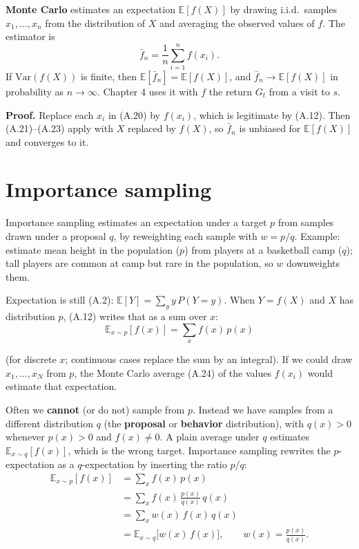\textbf{Monte Carlo} estimates an expectation $\mathbb{E}[f(X)]$ by drawing i.i.d.\ samples $x_1,\ldots,x_n$ from the distribution of $X$ and averaging the observed values of $f$. The estimator is
\begin{equation}
\bar{f}_n
=
\frac{1}{n}\sum_{i=1}^{n} f(x_i).
\tag{A.24}\label{eq:A.24}
\end{equation}
If $\mathrm{Var}(f(X))$ is finite, then $\mathbb{E}[\bar{f}_n]=\mathbb{E}[f(X)]$, and $\bar{f}_n\to\mathbb{E}[f(X)]$ in probability as $n\to\infty$. Chapter 4 uses it with $f$ the return $G_t$ from a visit to $s$.

\textbf{Proof.}
Replace each $x_i$ in (A.20) by $f(x_i)$, which is legitimate by (A.12). Then (A.21)--(A.23) apply with $X$ replaced by $f(X)$, so $\bar{f}_n$ is unbiased for $\mathbb{E}[f(X)]$ and converges to it.

\section{Importance sampling}

Importance sampling estimates an expectation under a target $p$ from samples drawn under a proposal $q$, by reweighting each sample with $w=p/q$. Example: estimate mean height in the population ($p$) from players at a basketball camp ($q$); tall players are common at camp but rare in the population, so $w$ downweights them.

Expectation is still (A.2): $\mathbb{E}[Y]=\sum_y y\,P(Y=y)$. When $Y=f(X)$ and $X$ has distribution $p$, (A.12) writes that as a sum over $x$: \[
\mathbb{E}_{x\sim p}[f(x)]
=
\sum_x f(x)\, p(x)
\]

(for discrete $x$; continuous cases replace the sum by an integral). If we could draw $x_1,\ldots,x_N$ from $p$, the Monte Carlo average (A.24) of the values $f(x_i)$ would estimate that expectation.

Often we \textbf{cannot} (or do not) sample from $p$. Instead we have samples from a different distribution $q$ (the \textbf{proposal} or \textbf{behavior} distribution), with $q(x)>0$ whenever $p(x)>0$ and $f(x)\neq 0$. A plain average under $q$ estimates $\mathbb{E}_{x\sim q}[f(x)]$, which is the wrong target. Importance sampling rewrites the $p$-expectation as a $q$-expectation by inserting the ratio $p/q$: \begin{equation}
\begin{aligned}
\mathbb{E}_{x\sim p}[f(x)]
&=
\sum_x f(x)\, p(x)
\\
&=
\sum_x f(x)\, \frac{p(x)}{q(x)}\, q(x)
\\
&=
\sum_x w(x)\, f(x)\, q(x)
\\
&=
\mathbb{E}_{x\sim q}\bigl[w(x)\, f(x)\bigr],
\qquad
w(x)=\frac{p(x)}{q(x)}.
\end{aligned}
\tag{A.13}\label{eq:A.13}
\end{equation}

